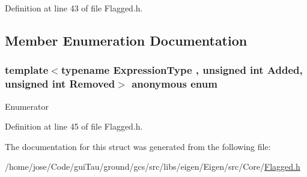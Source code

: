 Definition at line 43 of file Flagged.\-h.



\subsection{Member Enumeration Documentation}
\hypertarget{structei__traits_3_01_flagged_3_01_expression_type_00_01_added_00_01_removed_01_4_01_4_abede5f325899f1e232496745890a4f6d}{\subsubsection[{anonymous enum}]{\setlength{\rightskip}{0pt plus 5cm}template$<$typename Expression\-Type , unsigned int Added, unsigned int Removed$>$ anonymous enum}}\label{structei__traits_3_01_flagged_3_01_expression_type_00_01_added_00_01_removed_01_4_01_4_abede5f325899f1e232496745890a4f6d}
\begin{Desc}
\item[Enumerator]\par
\begin{description}
\item[{\em 
\hypertarget{structei__traits_3_01_flagged_3_01_expression_type_00_01_added_00_01_removed_01_4_01_4_abede5f325899f1e232496745890a4f6da7575a08a7a8eb5cd2cd0dd88b1c3af7d}{Flags}\label{structei__traits_3_01_flagged_3_01_expression_type_00_01_added_00_01_removed_01_4_01_4_abede5f325899f1e232496745890a4f6da7575a08a7a8eb5cd2cd0dd88b1c3af7d}
}]\end{description}
\end{Desc}


Definition at line 45 of file Flagged.\-h.



The documentation for this struct was generated from the following file\-:\begin{DoxyCompactItemize}
\item 
/home/jose/\-Code/gui\-Tau/ground/gcs/src/libs/eigen/\-Eigen/src/\-Core/\hyperlink{_flagged_8h}{Flagged.\-h}\end{DoxyCompactItemize}
